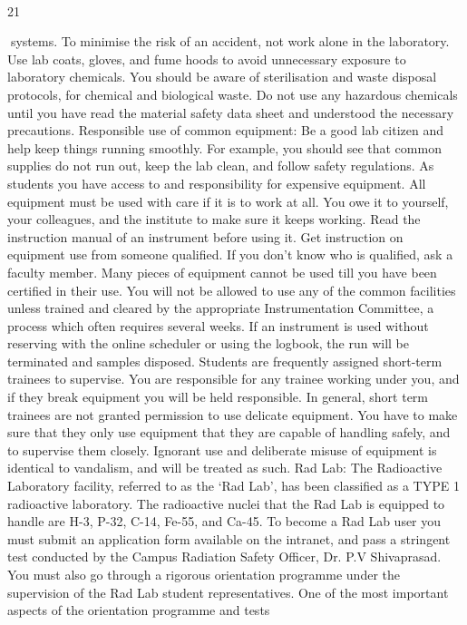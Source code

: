 \documentclass[a4paper,10pt]{article}
\begin{document}
  

21	
  

systems. To minimise the risk of an accident, not work alone in the laboratory. Use lab
coats, gloves, and fume hoods to avoid unnecessary exposure to laboratory chemicals. You
should be aware of sterilisation and waste disposal protocols, for chemical and biological
waste. Do not use any hazardous chemicals until you have read the material safety data sheet
and understood the necessary precautions.
Responsible use of common equipment: Be a good lab citizen and help keep things
running smoothly. For example, you should see that common supplies do not run out, keep
the lab clean, and follow safety regulations. As students you have access to and
responsibility for expensive equipment. All equipment must be used with care if it is to work
at all. You owe it to yourself, your colleagues, and the institute to make sure it keeps
working. Read the instruction manual of an instrument before using it. Get instruction on
equipment use from someone qualified. If you don't know who is qualified, ask a faculty
member. Many pieces of equipment cannot be used till you have been certified in their use.
You will not be allowed to use any of the common facilities unless trained and cleared by
the appropriate Instrumentation Committee, a process which often requires several weeks. If
an instrument is used without reserving with the online scheduler or using the logbook, the
run will be terminated and samples disposed. Students are frequently assigned short-term
trainees to supervise. You are responsible for any trainee working under you, and if they
break equipment you will be held responsible. In general, short term trainees are not granted
permission to use delicate equipment. You have to make sure that they only use equipment
that they are capable of handling safely, and to supervise them closely. Ignorant use and
deliberate misuse of equipment is identical to vandalism, and will be treated as such.
Rad Lab: The Radioactive Laboratory facility, referred to as the ‘Rad Lab’, has been
classified as a TYPE 1 radioactive laboratory. The radioactive nuclei that the Rad Lab is
equipped to handle are H-3, P-32, C-14, Fe-55, and Ca-45. To become a Rad Lab user you
must submit an application form available on the intranet, and pass a stringent test
conducted by the Campus Radiation Safety Officer, Dr. P.V Shivaprasad. You must also go
through a rigorous orientation programme under the supervision of the Rad Lab student
representatives. One of the most important aspects of the orientation programme and tests
\end{document}
